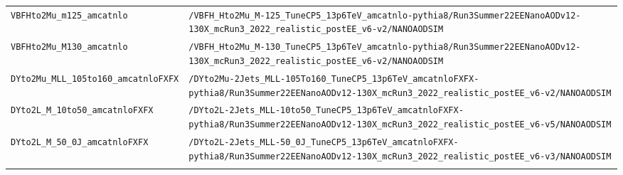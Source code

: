 \begin{longtable}{@{}>{\RaggedRight\arraybackslash}p{} >{\RaggedRight\arraybackslash}p{}@{}}
\addlinespace[2pt]
\texttt{VBFHto2Mu\_\allowbreak{}m125\_\allowbreak{}amcatnlo} & \texttt{/\allowbreak{}VBFH\_\allowbreak{}Hto2Mu\_\allowbreak{}M-\allowbreak{}125\_\allowbreak{}TuneCP5\_\allowbreak{}13p6TeV\_\allowbreak{}amcatnlo-\allowbreak{}pythia8/\allowbreak{}Run3Summer22EENanoAODv12-\allowbreak{}130X\_\allowbreak{}mcRun3\_\allowbreak{}2022\_\allowbreak{}realistic\_\allowbreak{}postEE\_\allowbreak{}v6-\allowbreak{}v2/\allowbreak{}NANOAODSIM} \\
\addlinespace[2pt]
\texttt{VBFHto2Mu\_\allowbreak{}M130\_\allowbreak{}amcatnlo} & \texttt{/\allowbreak{}VBFH\_\allowbreak{}Hto2Mu\_\allowbreak{}M-\allowbreak{}130\_\allowbreak{}TuneCP5\_\allowbreak{}13p6TeV\_\allowbreak{}amcatnlo-\allowbreak{}pythia8/\allowbreak{}Run3Summer22EENanoAODv12-\allowbreak{}130X\_\allowbreak{}mcRun3\_\allowbreak{}2022\_\allowbreak{}realistic\_\allowbreak{}postEE\_\allowbreak{}v6-\allowbreak{}v2/\allowbreak{}NANOAODSIM} \\
\addlinespace[2pt]
\texttt{DYto2Mu\_\allowbreak{}MLL\_\allowbreak{}105to160\_\allowbreak{}amcatnloFXFX} & \texttt{/\allowbreak{}DYto2Mu-\allowbreak{}2Jets\_\allowbreak{}MLL-\allowbreak{}105To160\_\allowbreak{}TuneCP5\_\allowbreak{}13p6TeV\_\allowbreak{}amcatnloFXFX-\allowbreak{}pythia8/\allowbreak{}Run3Summer22EENanoAODv12-\allowbreak{}130X\_\allowbreak{}mcRun3\_\allowbreak{}2022\_\allowbreak{}realistic\_\allowbreak{}postEE\_\allowbreak{}v6-\allowbreak{}v2/\allowbreak{}NANOAODSIM} \\
\addlinespace[2pt]
\texttt{DYto2L\_\allowbreak{}M\_\allowbreak{}10to50\_\allowbreak{}amcatnloFXFX} & \texttt{/\allowbreak{}DYto2L-\allowbreak{}2Jets\_\allowbreak{}MLL-\allowbreak{}10to50\_\allowbreak{}TuneCP5\_\allowbreak{}13p6TeV\_\allowbreak{}amcatnloFXFX-\allowbreak{}pythia8/\allowbreak{}Run3Summer22EENanoAODv12-\allowbreak{}130X\_\allowbreak{}mcRun3\_\allowbreak{}2022\_\allowbreak{}realistic\_\allowbreak{}postEE\_\allowbreak{}v6-\allowbreak{}v5/\allowbreak{}NANOAODSIM} \\
\addlinespace[2pt]
\texttt{DYto2L\_\allowbreak{}M\_\allowbreak{}50\_\allowbreak{}0J\_\allowbreak{}amcatnloFXFX} & \texttt{/\allowbreak{}DYto2L-\allowbreak{}2Jets\_\allowbreak{}MLL-\allowbreak{}50\_\allowbreak{}0J\_\allowbreak{}TuneCP5\_\allowbreak{}13p6TeV\_\allowbreak{}amcatnloFXFX-\allowbreak{}pythia8/\allowbreak{}Run3Summer22EENanoAODv12-\allowbreak{}130X\_\allowbreak{}mcRun3\_\allowbreak{}2022\_\allowbreak{}realistic\_\allowbreak{}postEE\_\allowbreak{}v6-\allowbreak{}v3/\allowbreak{}NANOAODSIM} \\
\addlinespace[2pt]

\end{longtable}
